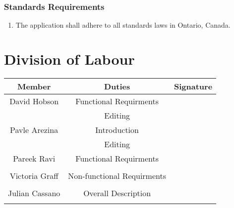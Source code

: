 \documentclass[12pt, titlepage]{article}
\newcommand\tab[1][1cm]{\hspace*{#1}}
\begin{document}
\subsubsection{Standards Requirements}
\label{ssub:standards_requirements}
\begin{enumerate}[{LR}2. ]
	\item The application shall adhere to all standards laws in Ontario, Canada.
\end{enumerate}


\appendix
\section{Division of Labour}
\label{sec:division_of_labour}
\begin{table}[h!]
\centering

\begin{tabular}{|c|c|c|}
\hline
{\bf Member} & {\bf Duties}&{\bf Signature}\\
\hline
{David Hobson} & {Functional Requirments } & {  \tab \tab \tab \tab}\\
{} & {Editing}  & {}\\
\hline
{Pavle Arezina} & {Introduction} & {}\\
{} & {Editing} & {}\\
\hline
{Pareek Ravi} & {Functional Requirments} & {}\\
{} & {} & {}\\
\hline
{Victoria Graff} & {Non-functional Requirments} & {}\\
{} & {} & {}\\
\hline
{Julian Cassano} & {Overall Description} & {}\\
{} & {} & {}\\
\hline
\end{tabular}

\end{table}
\end{document}
